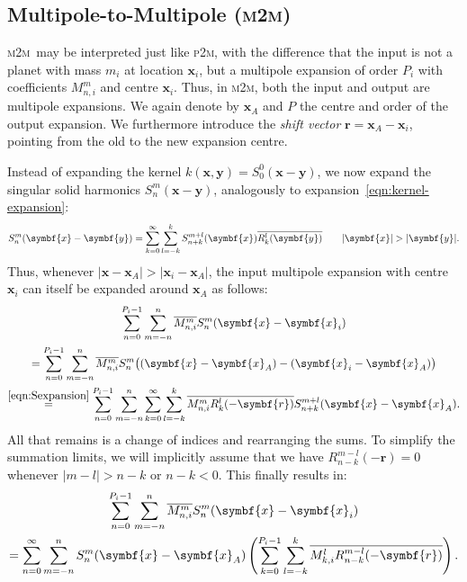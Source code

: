 \documentclass{scrbook}
\newcommand{\PtoM}{\textsc{p2m}}
\newcommand{\MtoM}{\textsc{m2m}}
\newcommand{\vv}[1]{\ensuremath{\symbf{#1}}} %
\begin{document}
\subsection{Multipole-to-Multipole (\MtoM)}
\MtoM\ may be interpreted just like \PtoM, with the difference that the input
is not a planet with mass $m_i$ at location $\vv{x}_i$, but a multipole
expansion of order $P_i$ with coefficients $M_{n,i}^m$ and centre
$\vv{x}_i$. Thus, in \MtoM, both the input and output are multipole expansions.
We again denote by $\vv{x}_A$ and $P$ the centre and order of the output
expansion. We furthermore introduce the \emph{shift vector} $\vv{r}=
\vv{x}_A-\vv{x}_i$, pointing from the old to the new expansion centre.

Instead of expanding the kernel $k(\vv{x},\vv{y})=S_0^0(\vv{x}-\vv{y})$, we
now expand the singular solid harmonics $S_n^m(\vv{x}-\vv{y})$, analogously to
expansion~\eqref{eqn:kernel-expansion}:\autocite[Equation~(49)]{dehnen2014}
\begin{equation}\label{eqn:Sexpansion}
S_n^m(\vv{x}-\vv{y}) = \sum_{k=0}^{\infty}\sum_{l=-k\vphantom{0}}^{k}
S_{n+k}^{m+l}(\vv{x})\overline{R_k^l(\vv{y})}\qquad |\vv{x}| > |\vv{y}|.
\end{equation}
Thus, whenever $|\vv{x}-\vv{x}_A| > |\vv{x}_i-\vv{x}_A|$, the input multipole
expansion with centre $\vv{x}_i$ can itself be expanded around $\vv{x}_A$ as
follows:
\begin{multline}
\sum_{n=0}^{P_i-1}\sum_{m=-n\vphantom{0}}^{n}
\overline{M_{n,i}^m}S_n^m(\vv{x}-\vv{x}_i) \\
=
\sum_{n=0}^{P_i-1}\sum_{m=-n\vphantom{0}}^{n}
\overline{M_{n,i}^m}S_n^m\bigl((\vv{x}-\vv{x}_A)-(\vv{x}_i-\vv{x}_A)\bigr) \\
\stackrel{\eqref{eqn:Sexpansion}}{=}
\sum_{n=0}^{P_i-1}\sum_{m=-n\vphantom{0}}^{n}
\sum_{k=0}^{\infty}\sum_{l=-k\vphantom{0}}^{k}
\overline{M_{n,i}^mR_k^l(-\vv{r})}S_{n+k}^{m+l}(\vv{x}-\vv{x}_A).
\end{multline}
All that remains is a change of indices and rearranging the sums. To simplify
the summation limits, we will implicitly assume that we have $R_{n-k}^{m-l}
(-\vv{r})=0$ whenever $|m-l| > n-k$ or $n-k<0$. This finally results in:
\begin{multline}
\sum_{n=0}^{P_i-1}\sum_{m=-n\vphantom{0}}^{n}
\overline{M_{n,i}^m}S_n^m(\vv{x}-\vv{x}_i) \\
=
\sum_{n=0}^{\infty}\sum_{m=-n\vphantom{0}}^{n}
S_{n}^{m}(\vv{x}-\vv{x}_A)
\left(
\sum_{k=0}^{P_i-1}\sum_{l=-k}^{k}
\overline{M_{k,i}^{l}R_{n-k}^{m-l}(-\vv{r})}
\right).
\end{multline}
\end{document}
